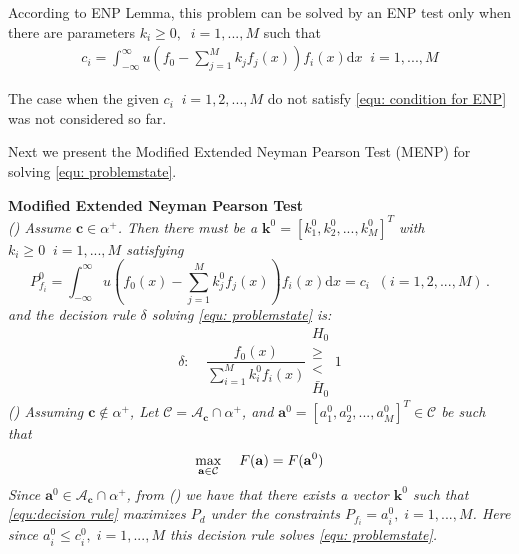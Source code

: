 \documentclass[12pt,journal,a4paper,twoside,onecolumn]{IEEEtran}
\newcommand{\rmnum}[1]{\romannumeral #1}
\begin{document}
\begin{spacing}{2.5}
According to ENP Lemma, this problem can be solved by an ENP test only when there are parameters $k_i \geq 0, \;\;i=1, ..., M$ such that 
\begin{equation}
\label{equ: condition for ENP}
\begin{split}
c_i = \int_{-\infty}^{\infty}u(f_0 - \sum_{j=1}^{M}k_jf_j(x))f_i(x)\mathrm{d}x \;\;i = 1, ..., M
\end{split}
\end{equation}

The case when the given $c_i\;\;i = 1, 2, ..., M$ do not satisfy \eqref{equ: condition for ENP} was not considered so far. 

Next we present the Modified Extended Neyman Pearson Test (MENP) for solving \eqref{equ: problemstate}.

\noindent \textbf{Modified Extended Neyman Pearson Test}
\noindent \textit{
\\\textnormal{(\rmnum{1})} Assume $\mathbf{c} \in \alpha^+$. Then there must be a $\mathbf{k}^0 = [k_1^0, k_2^0, ..., k_M^0]^T$ with $k_i \geq 0\;\;i=1, ..., M$ satisfying
}
\begin{equation}
\label{equ:Pf}
  P_{f_i}^0 = \int_{-\infty}^{\infty} u(f_0(x) - \sum_{j=1}^{M}k_j^0f_j(x))f_i(x)\mathrm{d}x = c_i \;\; (i= 1, 2, ..., M)\,.
\end{equation}
\textit{
    and the decision rule $\delta $ solving  \eqref{equ: problemstate} is:
}
\begin{equation}
\label{equ:decision rule}
\delta:\;\;\;\;\frac{f_0(x)}{\sum_{i=1}^{M}k_i^0f_i(x)} \substack{H_0 \\ \geq \\ < \\ \bar{H}_0} 1
\end{equation}
\textit{
\noindent \textnormal{(\rmnum{2})} Assuming $\mathbf{c} \notin \alpha^+$, Let $\mathcal{C} = \mathcal{A}_{\mathbf{c}} \cap \alpha^+$, and $\mathbf{a}^0 = [a_1^0, a_2^0, ..., a_M^0]^T \in \mathcal{C}$ be such that
}
\begin{equation}
\label{equ: F0}
\max_{\mathbf{a} \in \mathcal{C}}\;\;\;\;F(\mathbf{a}) = F(\mathbf{a}^0)\\
\end{equation}
\textit{
Since $\mathbf{a}^0 \in \mathcal{A}_{\mathbf{c}} \cap \alpha^+$, from \textnormal{(\rmnum{1})} we have that there exists a vector $\mathbf{k}^0$ such that \eqref{equ:decision rule}  maximizes $P_d$ under the constraints $P_{f_i} = a_i^0, \;i=1, ..., M$. Here since $a_i^0 \leq c_i^0, \;i=1, ..., M$ this decision rule  solves \eqref{equ: problemstate}.
}


\end{spacing}
\end{document}
